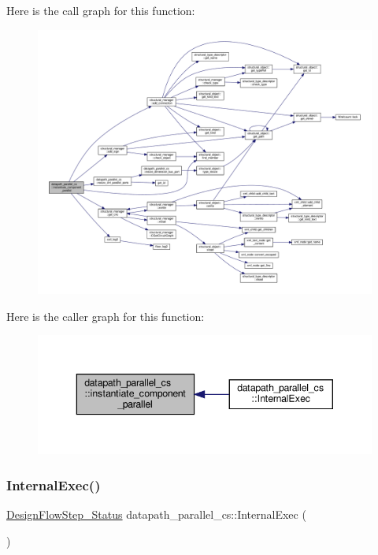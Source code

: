 Here is the call graph for this function\+:
\nopagebreak
\begin{figure}[H]
\begin{center}
\leavevmode
\includegraphics[width=350pt]{d7/d60/classdatapath__parallel__cs_af732dc543f89fa502e853c2abeac2ef8_cgraph}
\end{center}
\end{figure}
Here is the caller graph for this function\+:
\nopagebreak
\begin{figure}[H]
\begin{center}
\leavevmode
\includegraphics[width=343pt]{d7/d60/classdatapath__parallel__cs_af732dc543f89fa502e853c2abeac2ef8_icgraph}
\end{center}
\end{figure}
\mbox{\label{classdatapath__parallel__cs_a62fb8804158d6c6dcf922065f09c688f}} 
\subsubsection{\texorpdfstring{Internal\+Exec()}{InternalExec()}}
{\footnotesize\ttfamily \hyperlink{design__flow__step_8hpp_afb1f0d73069c26076b8d31dbc8ebecdf}{Design\+Flow\+Step\+\_\+\+Status} datapath\+\_\+parallel\+\_\+cs\+::\+Internal\+Exec (\begin{DoxyParamCaption}{ }\end{DoxyParamCaption})\hspace{0.3cm}{\ttfamily [virtual]}}



